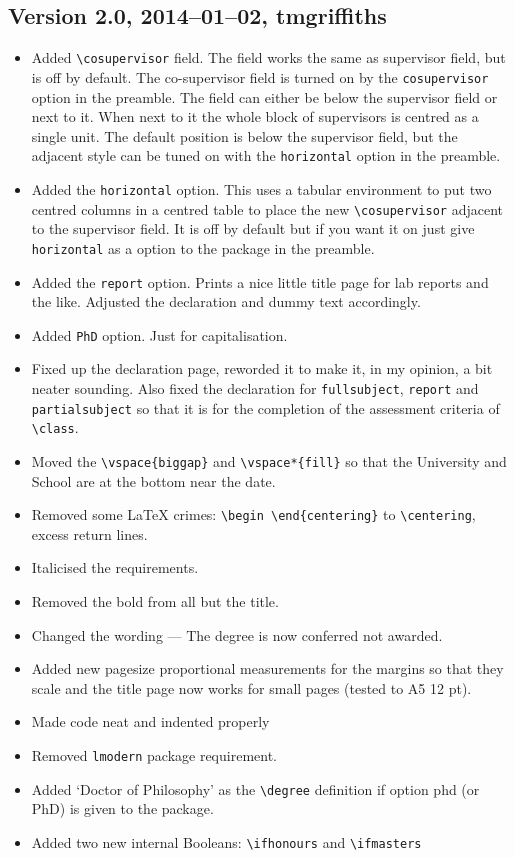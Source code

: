 \documentclass[12pt,oneside]{article}
\newcommand{\option}[1]{\texttt{\color{Green}#1}} %
\newcommand{\command}[1]{\texttt{\color{Red}#1}} %
\begin{document}
\subsection*{Version 2.0, 2014–01–02, tmgriffiths}
\begin{itemize}
    \item Added \command{\textbackslash{}cosupervisor} field. The field works the same as supervisor field, but is off by default. The co-supervisor field is turned on by the \option{cosupervisor} option in the preamble. The field can either be below the supervisor field or next to it. When next to it the whole block of supervisors is centred as a single unit. The default position is below the supervisor field, but the adjacent style can be tuned on with the \option{horizontal} option in the preamble.
    \item Added the \option{horizontal} option. This uses a tabular environment to put two centred columns in a centred table to place the new \command{\textbackslash{}cosupervisor} adjacent to the supervisor field. It is off by default but if you want it on just give \option{horizontal} as a option to the package in the preamble.
    \item Added the \option{report} option. Prints a nice little title page for lab reports and the like. Adjusted the declaration and dummy text accordingly.
    \item Added \option{PhD} option. Just for capitalisation.
    \item Fixed up the declaration page, reworded it to make it, in my opinion, a bit neater sounding. Also fixed the declaration for \option{fullsubject}, \option{report} and \option{partialsubject} so that it is for the completion of the assessment criteria of \command{\textbackslash{}class}.
    \item Moved the \texttt{\textbackslash{}vspace\{biggap\}} and \texttt{\textbackslash{}vspace*\{fill\}} so that the University
and School are at the bottom near the date.
    \item Removed some LaTeX crimes: \texttt{\textbackslash{}begin \textbackslash{}end\{centering\}\texttt{}} to \texttt{\textbackslash{}centering}, excess return lines.
    \item Italicised the requirements.
    \item Removed the bold from all but the title.
    \item Changed the wording — The degree is now conferred not awarded.
    \item Added new pagesize proportional measurements for the margins so that they scale and the title page now works for small pages (tested to A5 12 pt).
    \item Made code neat and indented properly
    \item Removed \texttt{lmodern} package requirement.
    \item Added `Doctor of Philosophy' as the \command{\textbackslash{}degree} definition if option phd (or
PhD) is given to the package.
    \item Added two new internal Booleans: \command{\textbackslash{}ifhonours} and \command{\textbackslash{}ifmasters}
    
\end{itemize}
\end{document}
